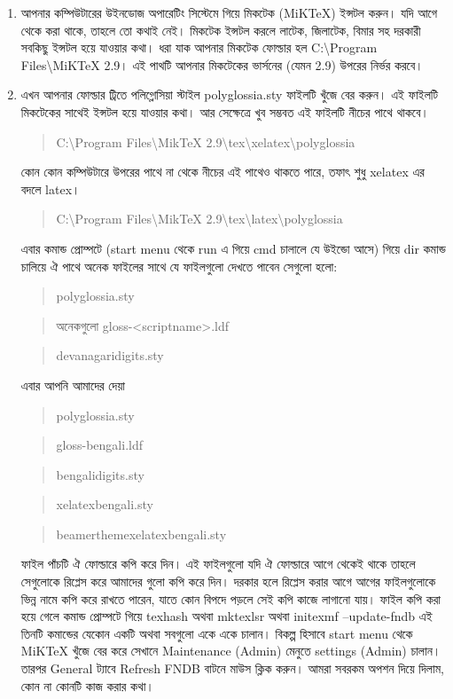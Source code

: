 \begin{enumerate}
\item আপনার কম্পিউটারের উইনডোজ অপারেটিং সিস্টেমে গিয়ে মিকটেক (MiKTeX) ইন্সটল করুন। যদি আগে থেকে করা থাকে, তাহলে তো কথাই নেই। মিকটেক ইন্সটল করলে লাটেক, জিলাটেক, বিমার সহ দরকারী সবকিছু ইন্সটল হয়ে যাওয়ার কথা। ধরা যাক আপনার মিকটেক ফোল্ডার হল C:\textbackslash{}Program Files\textbackslash{}MiKTeX 2.9। এই পাথটি আপনার মিকটেকের ভার্সনের (যেমন 2.9) উপরের নির্ভর করবে। 
\item এখন আপনার ফোল্ডার ট্রিতে পলিগ্লোসিয়া স্টাইল polyglossia.sty ফাইলটি খুঁজে বের করুন। এই ফাইলটি মিকটেকের সাথেই ইন্সটল হয়ে যাওয়ার কথা। আর সেক্ষেত্রে খুব সম্ভবত এই ফাইলটি নীচের পাথে থাকবে।
\begin{quote}C:\textbackslash{}Program Files\textbackslash{}MikTeX 2.9\textbackslash{}tex\textbackslash{}xelatex\textbackslash{}polyglossia\end{quote} কোন কোন কম্পিউটারে উপরের পাথে না থেকে নীচের এই পাথেও থাকতে পারে, তফাৎ শুধু xelatex এর বদলে latex। \begin{quote}C:\textbackslash{}Program Files\textbackslash{}MikTeX 2.9\textbackslash{}tex\textbackslash{}latex\textbackslash{}polyglossia\end{quote}এবার কমান্ড প্রোম্পটে (start menu থেকে run এ গিয়ে cmd চালালে যে উইন্ডো আসে) গিয়ে dir কমান্ড চালিয়ে ঐ পাথে অনেক ফাইলের সাথে যে ফাইলগুলো দেখতে পাবেন সেগুলো হলো: \begin{quote}polyglossia.sty\end{quote} \begin{quote}অনেকগুলো gloss-<scriptname>.ldf\end{quote} \begin{quote}devanagaridigits.sty\end{quote} এবার আপনি আমাদের দেয়া  \begin{quote}polyglossia.sty\end{quote}\begin{quote}gloss-bengali.ldf\end{quote} \begin{quote}bengalidigits.sty\end{quote} \begin{quote}xelatexbengali.sty\end{quote}\begin{quote}beamerthemexelatexbengali.sty\end{quote} ফাইল পাঁচটি ঐ ফোল্ডারে কপি করে দিন। এই ফাইলগুলো যদি ঐ ফোল্ডারে আগে থেকেই থাকে তাহলে সেগুলোকে রিপ্লেস করে আমাদের গুলো কপি করে দিন। দরকার হলে রিপ্লেস করার আগে আগের ফাইলগুলোকে ভিন্ন নামে কপি করে রাখতে পারেন, যাতে কোন বিপদে পড়লে সেই কপি কাজে লাগানো যায়। ফাইল কপি করা হয়ে গেলে কমান্ড প্রোম্পটে গিয়ে  texhash অথবা mktexlsr অথবা initexmf --update-fndb এই তিনটি কমান্ডের যেকোন একটি অথবা সবগুলো একে একে চালান। বিকল্প হিসাবে start menu থেকে MiKTeX খুঁজে বের করে সেখানে Maintenance (Admin) মেনুতে settings (Admin) চালান। তারপর General ট্যাবে Refresh FNDB বাটনে মাউস ক্লিক করুন। আমরা সবরকম অপশন দিয়ে দিলাম, কোন না কোনটি কাজ করার কথা।

\end{enumerate}
